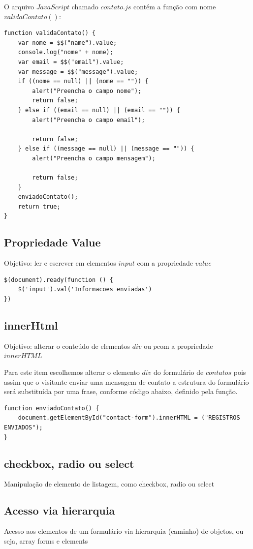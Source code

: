 	O arquivo $JavaScript$ chamado $contato.js$ contém a função com nome $validaContato()$:
\begin{lstlisting}
function validaContato() {
    var nome = $$("name").value;
    console.log("nome" + nome);
    var email = $$("email").value;
    var message = $$("message").value;
    if ((nome == null) || (nome == "")) {
        alert("Preencha o campo nome");
        return false;
    } else if ((email == null) || (email == "")) {
        alert("Preencha o campo email");

        return false;
    } else if ((message == null) || (message == "")) {
        alert("Preencha o campo mensagem");

        return false;
    }
    enviadoContato();
    return true;
}
\end{lstlisting}
	

\subsection{Propriedade Value}
	Objetivo: ler e escrever em elementos $input$ com a propriedade $value$
	
\begin{lstlisting}
$(document).ready(function () {
    $('input').val('Informacoes enviadas')
})
\end{lstlisting}


\subsection{innerHtml}
	Objetivo: alterar o conteúdo de elementos $div$ ou $p$com a propriedade $innerHTML$
	
	Para este item escolhemos alterar o elemento $div$ do formulário de $contatos$ pois assim que o visitante enviar uma mensagem de contato a estrutura do formulário será substituída por uma frase, conforme código abaixo, definido pela função.

\begin{lstlisting}
function enviadoContato() {
    document.getElementById("contact-form").innerHTML = ("REGISTROS ENVIADOS");
}
\end{lstlisting}


\subsection{checkbox, radio ou select}
Manipulação de elemento de listagem, como checkbox, radio ou select


\subsection{Acesso via hierarquia}
Acesso aos elementos de um formulário via hierarquia (caminho) de objetos, ou seja, array forms e elements



